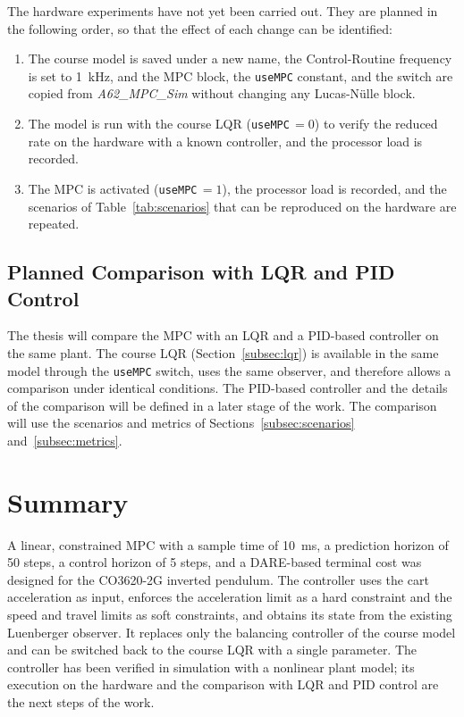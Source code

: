 The hardware experiments have not yet been carried out. They are planned in
the following order, so that the effect of each change can be identified:
\begin{enumerate}
  \item The course model is saved under a new name, the Control-Routine
        frequency is set to 1~kHz, and the \ac{MPC} block, the
        \texttt{useMPC} constant, and the switch are copied from
        \emph{A62\_MPC\_Sim} without changing any Lucas-Nülle block.
  \item The model is run with the course \ac{LQR} (\texttt{useMPC}$\,=0$) to
        verify the reduced rate on the hardware with a known controller, and
        the processor load is recorded.
  \item The \ac{MPC} is activated (\texttt{useMPC}$\,=1$), the processor load
        is recorded, and the scenarios of Table~\ref{tab:scenarios} that can be
        reproduced on the hardware are repeated.
\end{enumerate}

\subsection{Planned Comparison with LQR and PID Control}
\label{subsec:benchmark}

The thesis will compare the \ac{MPC} with an \ac{LQR} and a \ac{PID}-based
controller on the same plant. The course \ac{LQR}
(Section~\ref{subsec:lqr}) is available in the same model through the
\texttt{useMPC} switch, uses the same observer, and therefore allows a
comparison under identical conditions. The \ac{PID}-based controller and the
details of the comparison will be defined in a later stage of the work. The
comparison will use the scenarios and metrics of
Sections~\ref{subsec:scenarios} and~\ref{subsec:metrics}.

\section{Summary}
\label{sec:methodsummary}

A linear, constrained \ac{MPC} with a sample time of 10~ms, a prediction
horizon of 50 steps, a control horizon of 5 steps, and a \ac{DARE}-based
terminal cost was designed for the CO3620-2G inverted pendulum. The controller
uses the cart acceleration as input, enforces the acceleration limit as a hard
constraint and the speed and travel limits as soft constraints, and obtains
its state from the existing Luenberger observer. It replaces only the
balancing controller of the course model and can be switched back to the
course \ac{LQR} with a single parameter. The controller has been verified in
simulation with a nonlinear plant model; its execution on the hardware and the
comparison with \ac{LQR} and \ac{PID} control are the next steps of the
work.

